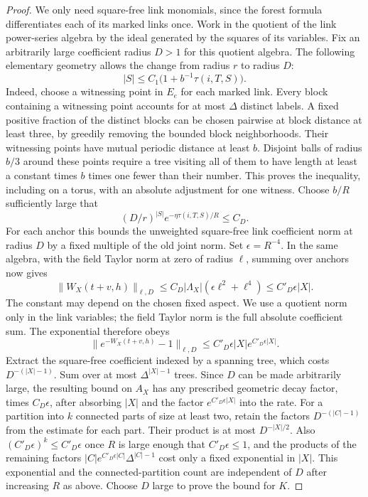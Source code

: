 \documentclass[11pt]{article}
\begin{document}
\begin{proof}
We only need square-free link monomials, since the forest formula
differentiates each of its marked links once. Work in the quotient
of the link power-series algebra by the ideal generated by the
squares of its variables. Fix an arbitrarily large coefficient
radius \(D>1\) for this quotient algebra. The following elementary
geometry allows the change from radius \(r\) to radius \(D\):
\[
 |S|\le C_1\bigl(1+b^{-1}\tau(i,T,S)\bigr).
\]
Indeed, choose a witnessing point in \(E_e\) for each marked link.
Every block containing a witnessing point accounts for at most
\(\Delta\) distinct labels. A fixed positive fraction of the distinct
blocks can be chosen pairwise at block distance at least three, by
greedily removing the bounded block neighborhoods. Their witnessing
points have mutual periodic distance at least \(b\). Disjoint balls
of radius \(b/3\) around these points require a tree visiting all
of them to have length at least a constant times \(b\) times
one fewer than their number. This proves the inequality,
including on a torus, with an absolute adjustment for one witness.
Choose \(b/R\) sufficiently large that
\[
 (D/r)^{|S|}e^{-\eta\tau(i,T,S)/R}\le C_D.
\]
For each anchor this bounds the unweighted square-free link
coefficient norm at radius \(D\) by a fixed multiple of the
old joint norm. Set \(\epsilon=R^{-4}\). In the same algebra,
with the field Taylor norm at zero of radius \(\ell\), summing over
anchors now gives
\[
 \|W_X(t+v,h)\|_{\ell,D}
    \le C_D|\Lambda_X|(\epsilon\ell^2+\ell^4)
    \le C'_D \epsilon |X| .
\]
The constant may depend on the chosen fixed aspect. We use a
quotient norm only in the link variables; the field Taylor
norm is the full absolute coefficient sum. The exponential
therefore obeys
\[
 \|e^{-W_X(t+v,h)}-1\|_{\ell,D}
      \le C'_D\epsilon |X| e^{C'_D\epsilon |X|}.
\]
Extract the square-free coefficient indexed by a spanning tree,
which costs \(D^{-(|X|-1)}\). Sum over at most
\(\Delta^{|X|-1}\) trees. Since \(D\) can be made arbitrarily
large, the resulting bound on \(A_X\) has any prescribed
geometric decay factor, times \(C_D\epsilon\), after absorbing
\(|X|\) and the factor \(e^{C'_D\epsilon |X|}\) into the rate.
For a partition into \(k\) connected parts of size at least two,
retain the factors \(D^{-(|C|-1)}\) from the estimate for each part.
Their product is at most \(D^{-|X|/2}\). Also
\((C'_D\epsilon)^k\le C'_D\epsilon\) once \(R\) is large enough
that \(C'_D\epsilon\le1\), and the products of the remaining factors
\(|C|e^{C'_D\epsilon|C|}\Delta^{|C|-1}\) cost only a fixed
exponential in \(|X|\). This exponential and the connected-partition
count are independent of \(D\) after increasing \(R\) as above.
Choose \(D\) large to prove the bound for \(K\).
\end{proof}
\end{document}
